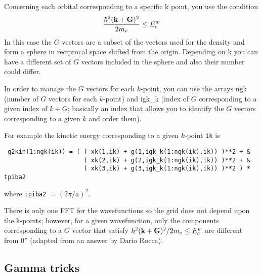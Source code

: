 \documentclass[12pt,a4paper]{article}
\begin{document}
Concerning each orbital corresponding to a specific k point, you
use the condition
\begin{equation}
  { \hbar^2 ({\bf k}+{\bf G})^2 \over 2m_e} \le E^w_c
\end{equation}
In this case the $G$ vectors are a subset of the vectors used for the
density and form a sphere in reciprocal space shifted from the origin.
Depending on k you can have a different set of $G$ vectors included
in the sphere and also their number could differ.

In order to manage the $G$ vectors for each $k$-point, you can use the arrays
ngk (number of $G$ vectors for each $k$-point) and igk\_k (index of $G$
corresponding to a given index of $k+G$; basically an index that allows
you to identify the $G$ vectors corresponding to a given $k$ and order them).

For example the kinetic energy corresponding to a given $k$-point \texttt{ik}
is
\begin{verbatim}
 g2kin(1:ngk(ik)) = ( ( xk(1,ik) + g(1,igk_k(1:ngk(ik),ik)) )**2 + &
                      ( xk(2,ik) + g(2,igk_k(1:ngk(ik),ik)) )**2 + &
                      ( xk(3,ik) + g(3,igk_k(1:ngk(ik),ik)) )**2 ) * tpiba2
\end{verbatim}
where \texttt{tpiba2} $= (2\pi/a)^2$.

There is only one FFT for the wavefunctions so the grid does not depend
upon the k-points; however, for a given wavefunction, only the components
corresponding to a $G$ vector that satisfy
$ { \hbar^2 ({\bf k}+{\bf G})^2 / 2m_e} \le E^w_c$
are different from 0'' (adapted from an answer by Dario Rocca).

\subsection{Gamma tricks}
\end{document}
